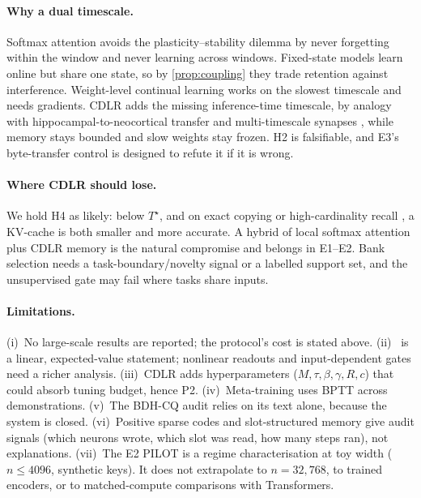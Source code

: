 \documentclass[10pt]{article}
\theoremstyle{remark}
\newcommand{\cdlr}{\textsc{CDLR}}
\begin{document}
\paragraph{Why a dual timescale.} Softmax attention avoids the plasticity--stability dilemma by never forgetting within
the window and never learning across windows. Fixed-state models learn online but share one state, so by
\cref{prop:coupling} they trade retention against interference. Weight-level continual learning
\citep{kirkpatrick2017ewc,zenke2017si} works on the slowest timescale and needs gradients. \cdlr{} adds the missing
inference-time timescale, by analogy with hippocampal-to-neocortical transfer \citep{mcclelland1995cls} and
multi-timescale synapses \citep{benna2016consolidation}, while memory stays bounded and slow weights stay frozen. H2 is
falsifiable, and E3's byte-transfer control is designed to refute it if it is wrong.

\paragraph{Where \cdlr{} should lose.} We hold H4 as likely: below $T^\star$, and on exact copying or high-cardinality
recall \citep{arora2023zoology,jelassi2024repeat}, a KV-cache is both smaller and more accurate. A hybrid of local
softmax attention plus \cdlr{} memory is the natural compromise and belongs in E1--E2. Bank selection needs a
task-boundary/novelty signal or a labelled support set, and the unsupervised gate may fail where tasks share inputs.

\paragraph{Limitations.} (i)~No large-scale results are reported; the protocol's cost is stated above.
(ii)~ is a linear, expected-value statement; nonlinear readouts and input-dependent gates need a
richer analysis. (iii)~\cdlr{} adds hyperparameters ($M,\tau,\beta,\gamma,R,c$) that could absorb tuning budget, hence
P2. (iv)~Meta-training uses BPTT across demonstrations. (v)~The BDH-CQ audit relies on its text alone, because the
system is closed. (vi)~Positive sparse codes and slot-structured memory give audit signals (which neurons wrote,
which slot was read, how many steps ran), not explanations. (vii)~The E2 PILOT is a regime characterisation at
toy width ($n\le4096$, synthetic keys). It does not extrapolate to $n=32{,}768$, to trained encoders, or to
matched-compute comparisons with Transformers.
\end{document}
